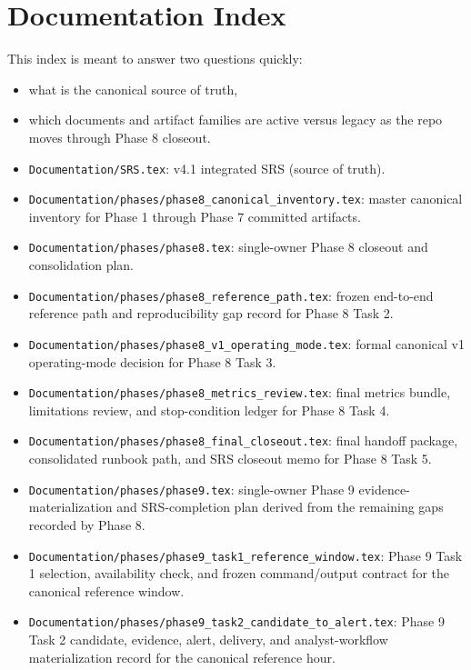 \documentclass{article}
\begin{document}
\section*{Documentation Index}

This index is meant to answer two questions quickly:
\begin{itemize}
\item what is the canonical source of truth,
\item which documents and artifact families are active versus legacy as the repo moves through Phase 8 closeout.
\end{itemize}

\begin{itemize}
\item \texttt{Documentation/SRS.tex}: v4.1 integrated SRS (source of truth).
\item \texttt{Documentation/phases/phase8\_canonical\_inventory.tex}: master canonical inventory for Phase 1 through Phase 7 committed artifacts.
\item \texttt{Documentation/phases/phase8.tex}: single-owner Phase 8 closeout and consolidation plan.
\item \texttt{Documentation/phases/phase8\_reference\_path.tex}: frozen end-to-end reference path and reproducibility gap record for Phase 8 Task 2.
\item \texttt{Documentation/phases/phase8\_v1\_operating\_mode.tex}: formal canonical v1 operating-mode decision for Phase 8 Task 3.
\item \texttt{Documentation/phases/phase8\_metrics\_review.tex}: final metrics bundle, limitations review, and stop-condition ledger for Phase 8 Task 4.
\item \texttt{Documentation/phases/phase8\_final\_closeout.tex}: final handoff package, consolidated runbook path, and SRS closeout memo for Phase 8 Task 5.
\item \texttt{Documentation/phases/phase9.tex}: single-owner Phase 9 evidence-materialization and SRS-completion plan derived from the remaining gaps recorded by Phase 8.
\item \texttt{Documentation/phases/phase9\_task1\_reference\_window.tex}: Phase 9 Task 1 selection, availability check, and frozen command/output contract for the canonical reference window.
\item \texttt{Documentation/phases/phase9\_task2\_candidate\_to\_alert.tex}: Phase 9 Task 2 candidate, evidence, alert, delivery, and analyst-workflow materialization record for the canonical reference hour.

\end{itemize}
\end{document}
